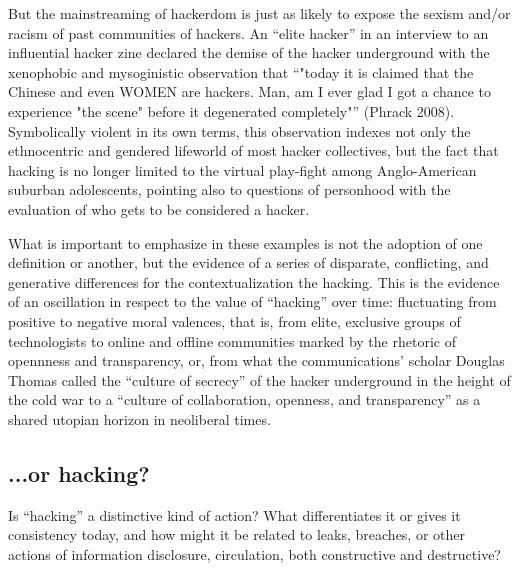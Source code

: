 \documentclass[10pt,letter,oneside]{scrartcl}
\begin{document}
But the mainstreaming of hackerdom is just as likely to expose the sexism and/or
racism of past communities of hackers.  An ``elite hacker'' in an interview to
an influential hacker zine declared the demise of the hacker underground with
the xenophobic and mysoginistic observation that ``"today it is claimed that the
Chinese and even WOMEN are hackers. Man, am I ever glad I got a chance to 
experience "the scene" before it degenerated completely"'' (Phrack 2008). 
Symbolically violent in its own terms, this observation indexes not only the 
ethnocentric and gendered lifeworld of most hacker collectives, but the fact that 
hacking is no longer limited to the virtual play-fight among Anglo-American suburban
adolescents, pointing also to questions of personhood with the evaluation of who gets to be considered a hacker.

What is important to emphasize in these examples is not the adoption of one
definition or another, but the evidence of a series of disparate, conflicting,
and generative differences for the contextualization the hacking. This is the
evidence of an oscillation in respect to the value of ``hacking'' over time:
fluctuating from positive to negative moral valences, that is, from elite,
exclusive groups of technologists to online and offline communities marked by
the rhetoric of opennness and transparency, or, from what the communications'
scholar Douglas Thomas called the ``culture of secrecy'' of the hacker
underground in the height of the cold war to a ``culture of collaboration, 
openness, and transparency'' as a shared utopian horizon in neoliberal times.

\subsection{...or hacking?}

Is ``hacking'' a distinctive kind of action?  What differentiates it or gives it
consistency today, and how might it be related to leaks, breaches, or other
actions of information disclosure, circulation, both constructive and
destructive?
\end{document}
